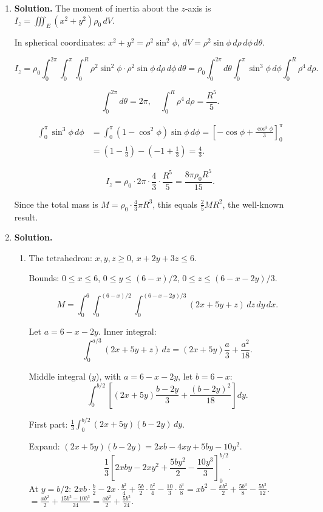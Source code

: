 \begin{enumerate}
\begin{enumerate}
Again, $\int_0^{2\pi}\cos\theta\sin\theta\,d\theta = 0$, so $\boxed{W = 0}$.
\end{enumerate}

\item \textbf{Solution.}
The moment of inertia about the $z$-axis is $I_z = \iiint_E (x^2+y^2)\rho_0\,dV$.

In spherical coordinates: $x^2+y^2 = \rho^2\sin^2\phi$, $dV = \rho^2\sin\phi\,d\rho\,d\phi\,d\theta$.

\[
I_z = \rho_0\int_0^{2\pi}\int_0^\pi\int_0^R\rho^2\sin^2\phi\cdot\rho^2\sin\phi\,d\rho\,d\phi\,d\theta = \rho_0\int_0^{2\pi}d\theta\int_0^\pi\sin^3\phi\,d\phi\int_0^R\rho^4\,d\rho.
\]

\[
\int_0^{2\pi}d\theta = 2\pi, \quad \int_0^R\rho^4\,d\rho = \frac{R^5}{5}.
\]

\begin{align*}
\int_0^\pi\sin^3\phi\,d\phi &= \int_0^\pi(1-\cos^2\phi)\sin\phi\,d\phi
= \left[-\cos\phi+\frac{\cos^3\phi}{3}\right]_0^\pi \\
&= \left(1-\frac{1}{3}\right)-\left(-1+\frac{1}{3}\right) = \frac{4}{3}.
\end{align*}

\[
I_z = \rho_0\cdot 2\pi\cdot\frac{4}{3}\cdot\frac{R^5}{5} = \boxed{\frac{8\pi\rho_0 R^5}{15}}.
\]

Since the total mass is $M = \rho_0\cdot\frac{4}{3}\pi R^3$, this equals $\frac{2}{5}MR^2$, the well-known result.

\item \textbf{Solution.}
\begin{enumerate}
\item The tetrahedron: $x,y,z\ge 0$, $x+2y+3z\le 6$.

Bounds: $0\le x\le 6$, $0\le y\le (6-x)/2$, $0\le z\le (6-x-2y)/3$.

\[
M = \int_0^6\int_0^{(6-x)/2}\int_0^{(6-x-2y)/3}(2x+5y+z)\,dz\,dy\,dx.
\]

Let $a = 6-x-2y$. Inner integral:
\[
\int_0^{a/3}(2x+5y+z)\,dz = (2x+5y)\frac{a}{3}+\frac{a^2}{18}.
\]

Middle integral ($y$), with $a = 6-x-2y$, let $b = 6-x$:
\[
\int_0^{b/2}\left[(2x+5y)\frac{b-2y}{3}+\frac{(b-2y)^2}{18}\right]dy.
\]

First part: $\frac{1}{3}\int_0^{b/2}(2x+5y)(b-2y)\,dy$.

Expand: $(2x+5y)(b-2y) = 2xb-4xy+5by-10y^2$.
\[
\frac{1}{3}\left[2xby-2xy^2+\frac{5by^2}{2}-\frac{10y^3}{3}\right]_0^{b/2}.
\]
At $y = b/2$: $2xb\cdot\frac{b}{2}-2x\cdot\frac{b^2}{4}+\frac{5b}{2}\cdot\frac{b^2}{4}-\frac{10}{3}\cdot\frac{b^3}{8} = xb^2-\frac{xb^2}{2}+\frac{5b^3}{8}-\frac{5b^3}{12}$.
$= \frac{xb^2}{2}+\frac{15b^3-10b^3}{24} = \frac{xb^2}{2}+\frac{5b^3}{24}$.


\end{enumerate}
\end{enumerate}
